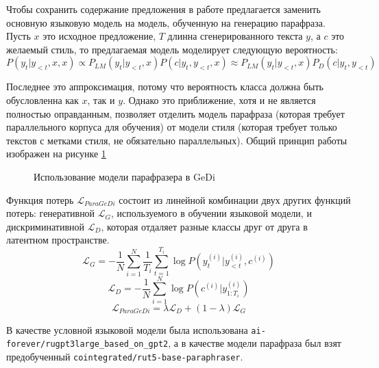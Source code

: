 Чтобы сохранить содержание предложения в работе \cite{dale2021text} предлагается заменить основную языковую модель на модель, обученную на генерацию парафраза.
Пусть $x$ это исходное предложение, $T$ длинна сгенерированного текста $y$, а $c$ это желаемый стиль, то предлагаемая модель моделирует следующую вероятность:
$$
P(y_t|y_{<t},x,x) \propto P_{LM}(y_t|y_{<t}, x)P(c|y_t,y_{<t},x)
\approx P_{LM}(y_t|y_{<t},x)P_D(c|y_t,y_{<t})
$$

Последнее это аппроксимация, потому что вероятность класса должна быть обусловленна как $x$, так и $y$.
Однако это приближение, хотя и не является полностью оправданным, позволяет     отделить модель парафраза (которая требует параллельного корпуса для обучения) от модели стиля (которая требует только текстов с метками стиля, не обязательно параллельных).
Общий принцип работы изображен на рисунке \ref{fig:gedi_paragedi}
\begin{figure}[ht]
  \centering
  \caption{Использование модели парафразера в GeDi}
  \label{fig:gedi_paragedi}
\end{figure}

Функция потерь $\mathcal{L}_{ParaGeDi}$ состоит из линейной комбинации двух других функций потерь: генеративной $\mathcal{L}_G$, используемого в обучении языковой модели, и дискриминативной $\mathcal{L}_D$, которая отдаляет разные классы друг от друга в латентном пространстве.
$$
\mathcal{L}_G = - \frac{1}{N} \sum_{i=1}^N 
\frac{1}{T_i} \sum_{t=1}^{T_i} \log P (y_t^{(i)}|y_{<t}^{(i)}, c^{(i)})
$$
$$
\mathcal{L}_D = - \frac{1}{N} \sum_{i=1}^N \log P(c^{(i)}|y_{1:T_i}^{(i)})
$$
$$
\mathcal{L}_{ParaGeDi} = \lambda \mathcal{L}_D + (1 - \lambda) \mathcal{L}_G
$$

В качестве условной языковой модели была использована \texttt{ai-forever/rugpt3large\_based\_on\_gpt2}, а в качестве модели парафраза был взят предобученный \texttt{cointegrated/rut5-base-paraphraser}.

